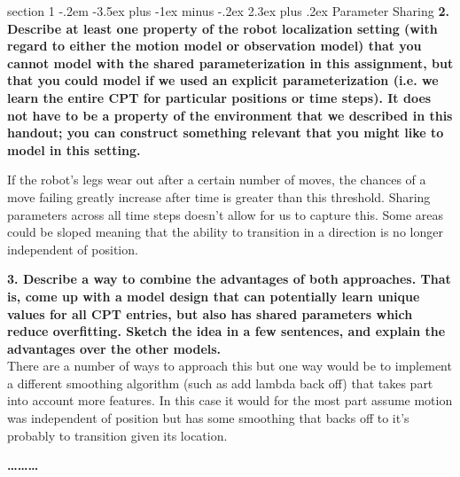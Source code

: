 \documentclass[12pt]{article}
\makeatletter
\newenvironment{problem}{\@startsection
       {section}
       {1}
       {-.2em}
       {-3.5ex plus -1ex minus -.2ex}
       {2.3ex plus .2ex}
       {\pagebreak[3]%
       \large\bf\noindent{Problem }
       }
       }
       {%
       \begin{center}\large\bf \ldots\ldots\ldots\end{center}}
\makeatother
\begin{document}
\begin{problem}{Parameter Sharing}
{\bf 2. Describe at least one property of the robot localization setting (with regard
to either the motion model or observation model) that you cannot model with the shared
parameterization in this assignment, but that you could model if we used an explicit
parameterization (i.e. we learn the entire CPT for particular positions or time steps). It
does not have to be a property of the environment that we described in this handout; you
can construct something relevant that you might like to model in this setting. }

If the robot's legs wear out after a certain number of moves, the 
chances of a move failing greatly increase after time is greater than
this threshold.  Sharing parameters across all time steps doesn't allow
for us to capture this. Some areas could be sloped meaning that the ability 
to transition in a direction is no longer independent of position. 

{\bf 3. Describe a way to combine the advantages of both approaches. That is, come
up with a model design that can potentially learn unique values for all CPT entries, but
also has shared parameters which reduce overfitting. Sketch the idea in a few sentences,
and explain the advantages over the other models. }\\

There are a number of ways to approach this but one way would be to implement a different smoothing algorithm (such as add lambda back off) that takes part into account more features. In this case it would for the most part assume motion was independent of position but has some smoothing that backs off to it's probably to transition given its location. 

\end{problem}{}
\end{document}
